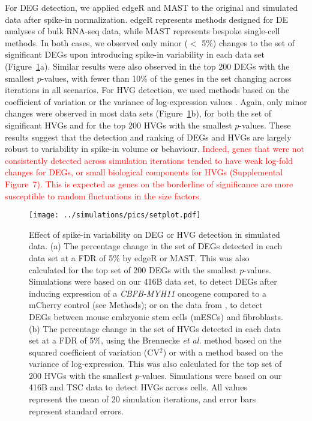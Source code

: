 \documentclass{article}
\newcommand{\suppfiglostsim}{7}
\newcommand{\revised}[1]{\textcolor{red}{#1}}
\begin{document}
For DEG detection, we applied edgeR \autocite{robinson2010edgeR} and MAST \autocite{finak2015mast} to the original and simulated data after spike-in normalization.
edgeR represents methods designed for DE analyses of bulk RNA-seq data, while MAST represents bespoke single-cell methods.
In both cases, we observed only minor ($<$ 5\%) changes to the set of significant DEGs upon introducing spike-in variability in each data set (Figure~\ref{fig:setchange}a). 
Similar results were also observed in the top 200 DEGs with the smallest $p$-values, with fewer than 10\% of the genes in the set changing across iterations in all scenarios.
For HVG detection, we used methods based on the coefficient of variation \autocite{brennecke2013accounting} or the variance of log-expression values \autocite{lun2016stepbystep}.
Again, only minor changes were observed in most data sets (Figure~\ref{fig:setchange}b), for both the set of significant HVGs and for the top 200 HVGs with the smallest $p$-values.
These results suggest that the detection and ranking of DEGs and HVGs are largely robust to variability in spike-in volume or behaviour.
\revised{Indeed, genes that were not consistently detected across simulation iterations tended to have weak log-fold changes for DEGs, or small biological components for HVGs (Supplemental Figure~\suppfiglostsim{}).
This is expected as genes on the borderline of significance are more susceptible to random fluctuations in the size factors.}

\begin{figure}[bt]
    \begin{center}
        \texttt{[image: ../simulations/pics/setplot.pdf]}
    \end{center}
    \caption{Effect of spike-in variability on DEG or HVG detection in simulated data.
        (a) The percentage change in the set of DEGs detected in each data set at a FDR of 5\% by edgeR or MAST.
        This was also calculated for the top set of 200 DEGs with the smallest $p$-values.
        Simulations were based on our 416B data set, to detect DEGs after inducing expression of a \textit{CBFB-MYH11} oncogene compared to a mCherry control (see Methods);
        or on the data from \citet{islam2011characterization}, to detect DEGs between mouse embryonic stem cells (mESCs) and fibroblasts.
        (b) The percentage change in the set of HVGs detected in each data set at a FDR of 5\%,
        using the Brennecke \textit{et al.} method based on the squared coefficient of variation (CV$^2$) or with a method based on the variance of log-expression.
        This was also calculated for the top set of 200 HVGs with the smallest $p$-values.
        Simulations were based on our 416B and TSC data to detect HVGs across cells.
        All values represent the mean of 20 simulation iterations, and error bars represent standard errors.
    }
    \label{fig:setchange}
\end{figure}
\end{document}
